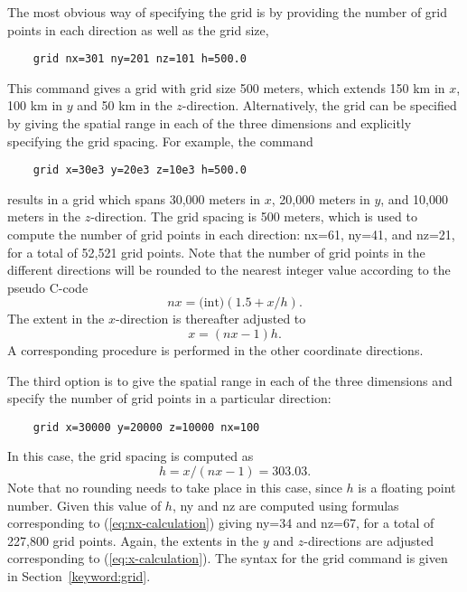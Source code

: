 \documentclass[11pt]{report}
\begin{document}
The most obvious way of specifying the grid is by providing the number of grid points in each
direction as well as the grid size,
%
\begin{verbatim}
	grid nx=301 ny=201 nz=101 h=500.0 
\end{verbatim}
%
This command gives a grid with grid size 500 meters, which extends 150 km in $x$, 100 km in $y$ and
50 km in the $z$-direction. Alternatively, the grid can be specified by giving the spatial range in
each of the three dimensions and explicitly specifying the grid spacing. For example, the command
%
\begin{verbatim}
	grid x=30e3 y=20e3 z=10e3 h=500.0 
\end{verbatim}
%
results in a grid which spans 30,000 meters in $x$, 20,000 meters in $y$, and 10,000
meters in the $z$-direction.  The grid spacing is 500 meters, which is used to compute the
number of grid points in each direction: nx=61, ny=41, and nz=21, for a total of
52,521 grid points. Note that the number of grid points in the different directions will be
rounded to the nearest integer value according to the pseudo C-code
\begin{equation}\label{eq:nx-calculation}
nx = \mbox{(int)} (1.5 + x/h).
\end{equation}
The extent in the $x$-direction is thereafter adjusted to
\begin{equation}\label{eq:x-calculation}
x=(nx-1) h.
\end{equation}
A corresponding procedure is performed in the other coordinate directions.

The third option is to give the spatial range in each of the three dimensions and specify the number
of grid points in a particular direction:
%
\begin{verbatim}
	grid x=30000 y=20000 z=10000 nx=100
\end{verbatim}
%
In this case, the grid spacing is computed as 
\[
h = x/(nx-1)= 303.03.
\]
Note that no rounding needs to take place in this case, since $h$ is a floating point number. Given this
value of $h$, ny and nz are computed using formulas corresponding to
(\ref{eq:nx-calculation}) giving ny=34 and nz=67, for a total of 227,800 grid points. Again,
the extents in the $y$ and $z$-directions are adjusted corresponding to (\ref{eq:x-calculation}). The syntax
for the grid command is given in Section~\ref{keyword:grid}.
\end{document}
